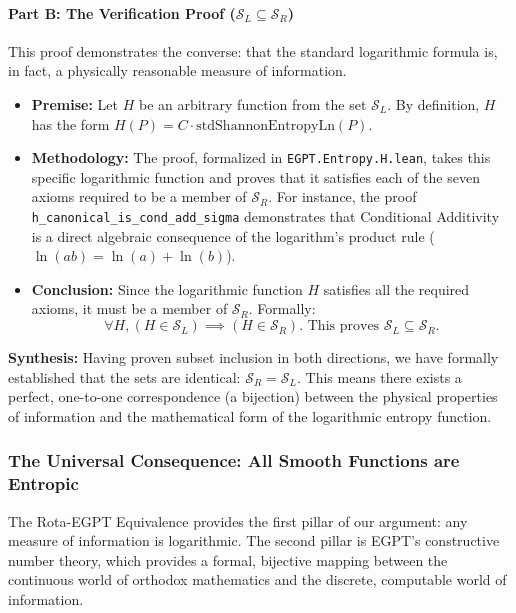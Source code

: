 \documentclass[11pt, letterpaper]{article}
\begin{document}
\paragraph{Part B: The Verification Proof ($\mathcal{S}_L \subseteq \mathcal{S}_R$)}
This proof demonstrates the converse: that the standard logarithmic formula is, in fact, a physically reasonable measure of information.

\begin{itemize}
    \item \textbf{Premise:} Let $H$ be an arbitrary function from the set $\mathcal{S}_L$. By definition, $H$ has the form $H(P) = C \cdot \text{stdShannonEntropyLn}(P)$.
    \item \textbf{Methodology:} The proof, formalized in \texttt{EGPT.Entropy.H.lean}, takes this specific logarithmic function and proves that it satisfies each of the seven axioms required to be a member of $\mathcal{S}_R$. For instance, the proof \texttt{h\_canonical\_is\_cond\_add\_sigma} demonstrates that Conditional Additivity is a direct algebraic consequence of the logarithm's product rule ($\ln(ab) = \ln(a) + \ln(b)$).
    \item \textbf{Conclusion:} Since the logarithmic function $H$ satisfies all the required axioms, it must be a member of $\mathcal{S}_R$. Formally:
    \[ \forall H, (H \in \mathcal{S}_L) \implies (H \in \mathcal{S}_R). \text{ This proves } \mathcal{S}_L \subseteq \mathcal{S}_R. \]
\end{itemize}

\textbf{Synthesis:} Having proven subset inclusion in both directions, we have formally established that the sets are identical: $\mathcal{S}_R = \mathcal{S}_L$. This means there exists a perfect, one-to-one correspondence (a bijection) between the physical properties of information and the mathematical form of the logarithmic entropy function.

\subsubsection{The Universal Consequence: All Smooth Functions are Entropic}
The Rota-EGPT Equivalence provides the first pillar of our argument: any measure of information is logarithmic. The second pillar is EGPT's constructive number theory, which provides a formal, bijective mapping between the continuous world of orthodox mathematics and the discrete, computable world of information.
\end{document}
